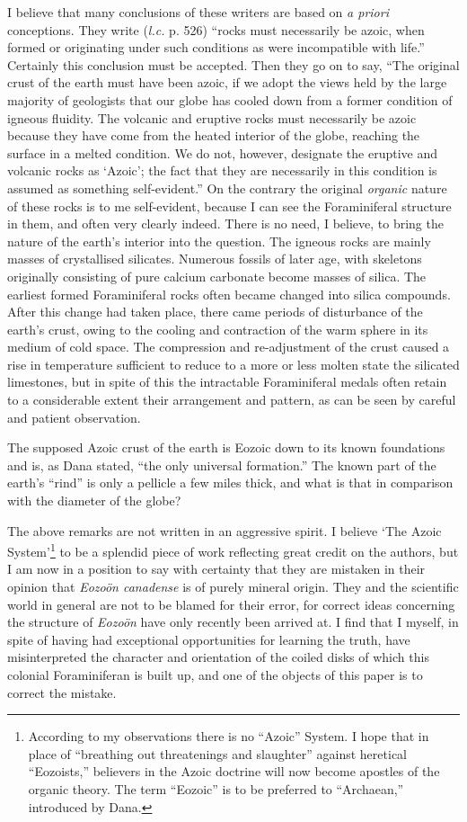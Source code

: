 \documentclass[a4paper, 12pt, oneside]{article}
\begin{document}
I believe that many conclusions of these writers are based on \emph{a priori} conceptions. They write (\emph{l.c.} p. 526) ``rocks must necessarily be azoic, when formed or originating under such conditions as were incompatible with life.'' Certainly this conclusion must be accepted. Then they go on to say, ``The original crust of the earth must have been azoic, if we adopt the views held by the large majority of geologists that our globe has cooled down from a former condition of igneous fluidity. The volcanic and eruptive rocks must necessarily be azoic because they have come from the heated interior of the globe, reaching the surface in a melted condition. We do not, however, designate the eruptive and volcanic rocks as `Azoic'; the fact that they are necessarily in this condition is assumed as something self-evident.'' On the contrary the original \emph{organic} nature of these rocks is to me self-evident, because I can see the Foraminiferal structure in them, and often very clearly indeed. There is no need, I believe, to bring the nature of the earth's interior into the question. The igneous rocks are mainly masses of crystallised silicates. Numerous fossils of later age, with skeletons originally consisting of pure calcium carbonate become masses of silica. The earliest formed Foraminiferal rocks often became changed into silica compounds. After this change had taken place, there came periods of disturbance of the earth's crust, owing to the cooling and contraction of the warm sphere in its medium of cold space. The compression and re-adjustment of the crust caused a rise in temperature sufficient to reduce to a more or less molten state the silicated limestones, but in spite of this the intractable Foraminiferal medals often retain to a considerable extent their arrangement and pattern, as can be seen by careful and patient observation.

The supposed Azoic crust of the earth is Eozoic down to its known foundations and is, as Dana stated, ``the only universal formation.'' The known part of the earth's ``rind'' is only a pellicle a few miles thick, and what is that in comparison with the diameter of the globe?

The above remarks are not written in an aggressive spirit. I believe `The Azoic System'\footnote{According to my observations there is no ``Azoic'' System. I hope that in place of ``breathing out threatenings and slaughter'' against heretical ``Eozoists,'' believers in the Azoic doctrine will now become apostles of the organic theory. The term ``Eozoic'' is to be preferred to ``Archaean,'' introduced by Dana.} to be a splendid piece of work reflecting great credit on the authors, but I am now in a position to say with certainty that they are mistaken in their opinion that \emph{Eozoön canadense} is of purely mineral origin. They and the scientific world in general are not to be blamed for their error, for correct ideas concerning the structure of \emph{Eozoön} have only recently been arrived at. I find that I myself, in spite of having had exceptional opportunities for learning the truth, have misinterpreted the character and orientation of the coiled disks of which this colonial Foraminiferan is built up, and one of the objects of this paper is to correct the mistake.
\end{document}
